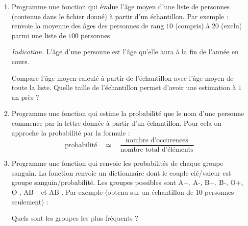\documentclass[11pt,class=report,crop=false]{standalone}
\begin{document}

\begin{activite}[Sondage]
	
		
\begin{enumerate}
	\item Programme une fonction  qui évalue l'âge moyen d'une liste de personnes (contenue dans le fichier donné)
	à partir d'un échantillon.
	Par exemple :
	renvoie la moyenne des âges des personnes de rang $10$ (compris) à $20$ (exclu) parmi une liste de $100$ personnes.
	
	\emph{Indication.} L'âge d'une personne est l'âge qu'elle aura à la fin de l'année en cours.
	
	Compare l'âge moyen calculé à partir de l'échantillon avec l'âge moyen de toute la liste. Quelle taille de l'échantillon permet d'avoir une estimation à $1$ an près ?
	
	\item Programme une fonction 
	qui estime la probabilité que le nom d'une personne commence par la lettre donnée à partir d'un échantillon.
	Pour cela on approche la probabilité par la formule :
	$$\text{probabilité} \quad \simeq \quad \frac{\text{nombre d'occurences}}{\text{nombre total d'éléments}}$$
	
	\item Programme une fonction  qui renvoie les probabilités de chaque groupe sanguin. La fonction renvoie un dictionnaire dont le couple \og{}clé/valeur\fg{} est \og{}groupe sanguin/probabilité\fg{}.
	Les groupes possibles sont A+, A-, B+, B-, O+, O-, AB+ et AB-.
	Par exemple (obtenu sur un échantillon de $10$ personnes seulement) :
	
	
	Quels sont les groupes les plus fréquents ?
	
\end{enumerate}
		
\end{activite}
\end{document}
